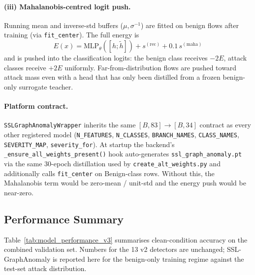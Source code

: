 \documentclass[11pt,a4paper]{article}
\begin{document}
\paragraph{(iii) Mahalanobis-centred logit push.}
Running mean and inverse-std buffers ($\mu, \sigma^{-1}$) are fitted
on benign flows after training (via \texttt{fit\_center}).  The full
energy is
\[
  E(x) = \mathrm{MLP}_\theta([h; \tilde{h}]) + s^{(\mathrm{rec})} + 0.1\, s^{(\mathrm{maha})}
\]
and is pushed into the classification logits: the benign class
receives $-2E$, attack classes receive $+2E$ uniformly.  Far-from-distribution
flows are pushed toward attack mass even with a head that has only
been distilled from a frozen benign-only surrogate teacher.

\paragraph{Platform contract.}
\texttt{SSLGraphAnomalyWrapper} inherits the same $[B,83] \to [B,34]$
contract as every other registered model (\texttt{N\_FEATURES},
\texttt{N\_CLASSES}, \texttt{BRANCH\_NAMES}, \texttt{CLASS\_NAMES},
\texttt{SEVERITY\_MAP}, \texttt{severity\_for}).  At startup the
backend's \texttt{\_ensure\_all\_weights\_present()} hook auto-generates
\texttt{ssl\_graph\_anomaly.pt} via the same 30-epoch distillation
used by \texttt{create\_alt\_weights.py} and additionally calls
\texttt{fit\_center} on Benign-class rows.  Without this, the
Mahalanobis term would be zero-mean / unit-std and the energy push
would be near-zero.

\subsection{Performance Summary}
Table~\ref{tab:model_performance_v3} summarises clean-condition
accuracy on the combined validation set.  Numbers for the 13 v2
detectors are unchanged; SSL-GraphAnomaly is reported here for the
benign-only training regime against the test-set attack distribution.
\end{document}
